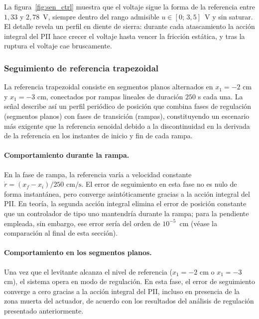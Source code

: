 La figura~\ref{fig:sen_ctrl} muestra que el voltaje sigue la forma de la referencia entre $1{,}33$ y $2{,}78$~V, siempre dentro del rango admisible $u \in [0;\,3{,}5]$~V y sin saturar. El detalle revela un perfil en diente de sierra: durante cada atascamiento la acción integral del PII hace crecer el voltaje hasta vencer la fricción estática, y tras la ruptura el voltaje cae bruscamente.

\FloatBarrier

\subsubsection{Seguimiento de referencia trapezoidal}

La referencia trapezoidal consiste en segmentos planos alternados en $x_1 = -2$ cm y
$x_1 = -3$ cm, conectados por rampas lineales de duración $250$ s cada una.
La señal describe así un perfil periódico de posición que combina fases de regulación
(segmentos planos) con fases de transición (rampas), constituyendo un escenario más exigente
que la referencia senoidal debido a la discontinuidad en la derivada de la referencia en los
instantes de inicio y fin de cada rampa.

\paragraph{Comportamiento durante la rampa.}
En la fase de rampa, la referencia varía a velocidad constante
$\dot{r} = (x_{f}-x_{i})/250 \text{ cm/s}$.
El error de seguimiento en esta fase no es nulo de forma instantánea,
pero converge asintóticamente gracias a la acción integral del PII.
En teoría, la segunda acción integral elimina el error de posición constante que un controlador de tipo uno mantendría durante la rampa; para la pendiente empleada, sin embargo, ese error sería del orden de $10^{-5}$~cm (véase la comparación al final de esta sección).

\paragraph{Comportamiento en los segmentos planos.}
Una vez que el levitante alcanza el nivel de referencia ($x_1 = -2$ cm o $x_1 = -3$ cm),
el sistema opera en modo de regulación.
En esta fase, el error de seguimiento converge a cero gracias a la acción integral del PII,
incluso en presencia de la zona muerta del actuador, de acuerdo con los resultados del
análisis de regulación presentado anteriormente.

